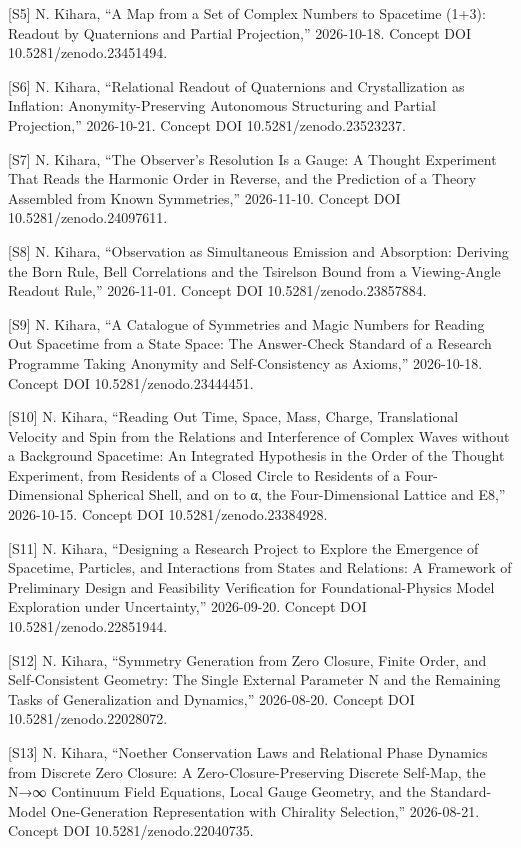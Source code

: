 \documentclass[
  a4paper,
]{article}
\begin{document}
{[}S5{]} N. Kihara, ``A Map from a Set of Complex Numbers to Spacetime
(1+3): Readout by Quaternions and Partial Projection,'' 2026-10-18.
Concept DOI 10.5281/zenodo.23451494.

{[}S6{]} N. Kihara, ``Relational Readout of Quaternions and
Crystallization as Inflation: Anonymity-Preserving Autonomous
Structuring and Partial Projection,'' 2026-10-21. Concept DOI
10.5281/zenodo.23523237.

{[}S7{]} N. Kihara, ``The Observer's Resolution Is a Gauge: A Thought
Experiment That Reads the Harmonic Order in Reverse, and the Prediction
of a Theory Assembled from Known Symmetries,'' 2026-11-10. Concept DOI
10.5281/zenodo.24097611.

{[}S8{]} N. Kihara, ``Observation as Simultaneous Emission and
Absorption: Deriving the Born Rule, Bell Correlations and the Tsirelson
Bound from a Viewing-Angle Readout Rule,'' 2026-11-01. Concept DOI
10.5281/zenodo.23857884.

{[}S9{]} N. Kihara, ``A Catalogue of Symmetries and Magic Numbers for
Reading Out Spacetime from a State Space: The Answer-Check Standard of a
Research Programme Taking Anonymity and Self-Consistency as Axioms,''
2026-10-18. Concept DOI 10.5281/zenodo.23444451.

{[}S10{]} N. Kihara, ``Reading Out Time, Space, Mass, Charge,
Translational Velocity and Spin from the Relations and Interference of
Complex Waves without a Background Spacetime: An Integrated Hypothesis
in the Order of the Thought Experiment, from Residents of a Closed
Circle to Residents of a Four-Dimensional Spherical Shell, and on to α,
the Four-Dimensional Lattice and E8,'' 2026-10-15. Concept DOI
10.5281/zenodo.23384928.

{[}S11{]} N. Kihara, ``Designing a Research Project to Explore the
Emergence of Spacetime, Particles, and Interactions from States and
Relations: A Framework of Preliminary Design and Feasibility
Verification for Foundational-Physics Model Exploration under
Uncertainty,'' 2026-09-20. Concept DOI 10.5281/zenodo.22851944.

{[}S12{]} N. Kihara, ``Symmetry Generation from Zero Closure, Finite
Order, and Self-Consistent Geometry: The Single External Parameter N and
the Remaining Tasks of Generalization and Dynamics,'' 2026-08-20.
Concept DOI 10.5281/zenodo.22028072.

{[}S13{]} N. Kihara, ``Noether Conservation Laws and Relational Phase
Dynamics from Discrete Zero Closure: A Zero-Closure-Preserving Discrete
Self-Map, the N→∞ Continuum Field Equations, Local Gauge Geometry, and
the Standard-Model One-Generation Representation with Chirality
Selection,'' 2026-08-21. Concept DOI 10.5281/zenodo.22040735.
\end{document}

